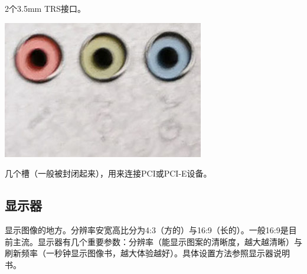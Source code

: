 2个3.5mm TRS接口。
\begin{center}
	\includegraphics[scale=0.6]{pic/TRS}
\end{center}\par
几个槽（一般被封闭起来），用来连接PCI或PCI-E设备。
\subsection{显示器}
显示图像的地方。分辨率安宽高比分为4:3（方的）与16:9（长的）。一般16:9是目前主流。显示器有几个重要参数：分辨率（能显示图案的清晰度，越大越清晰）与刷新频率（一秒钟显示图像书，越大体验越好）。具体设置方法参照显示器说明书。

